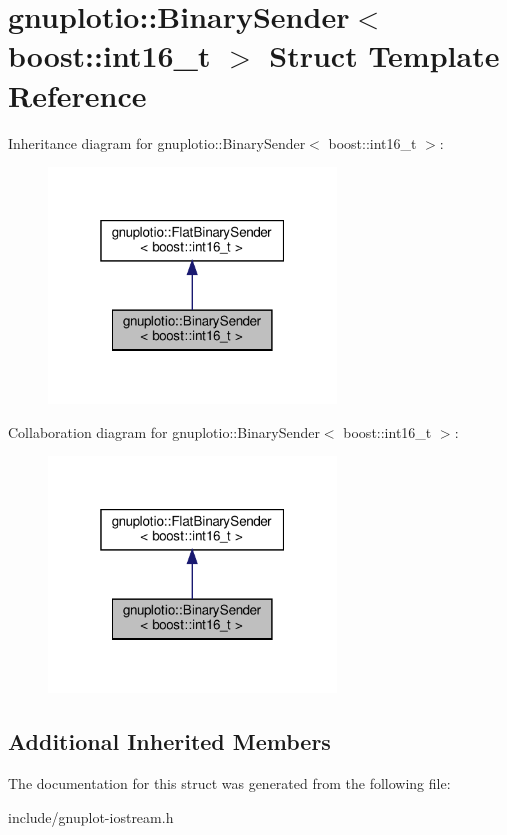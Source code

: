 \hypertarget{structgnuplotio_1_1BinarySender_3_01boost_1_1int16__t_01_4}{}\section{gnuplotio\+:\+:Binary\+Sender$<$ boost\+:\+:int16\+\_\+t $>$ Struct Template Reference}
\label{structgnuplotio_1_1BinarySender_3_01boost_1_1int16__t_01_4}


Inheritance diagram for gnuplotio\+:\+:Binary\+Sender$<$ boost\+:\+:int16\+\_\+t $>$\+:\nopagebreak
\begin{figure}[H]
\begin{center}
\leavevmode
\includegraphics[width=217pt]{structgnuplotio_1_1BinarySender_3_01boost_1_1int16__t_01_4__inherit__graph}
\end{center}
\end{figure}


Collaboration diagram for gnuplotio\+:\+:Binary\+Sender$<$ boost\+:\+:int16\+\_\+t $>$\+:\nopagebreak
\begin{figure}[H]
\begin{center}
\leavevmode
\includegraphics[width=217pt]{structgnuplotio_1_1BinarySender_3_01boost_1_1int16__t_01_4__coll__graph}
\end{center}
\end{figure}
\subsection*{Additional Inherited Members}


The documentation for this struct was generated from the following file\+:\begin{DoxyCompactItemize}
\item 
include/gnuplot-\/iostream.\+h\end{DoxyCompactItemize}
